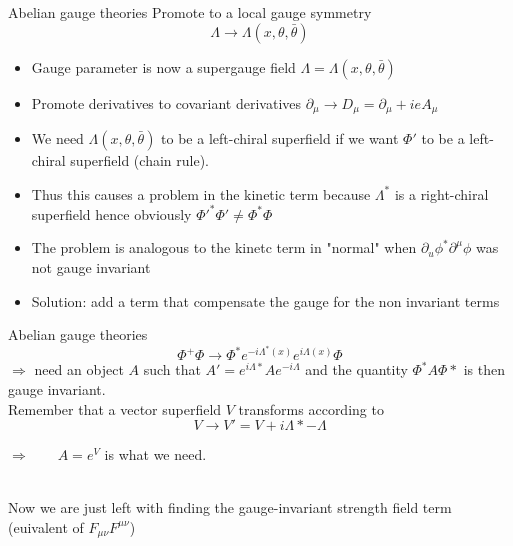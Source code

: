 \documentclass[10pt]{beamer}
\begin{document}
\begin{frame}{Abelian gauge theories}
Promote to a local gauge symmetry
\begin{equation*}
    \Lambda \to \Lambda(x, \theta, \bar\theta)
\end{equation*}
\begin{itemize}
    \item Gauge parameter is now a supergauge field $\Lambda = \Lambda(x, \theta, \bar\theta)$
    \item Promote derivatives to covariant derivatives $\partial_\mu \to D_\mu = \partial_\mu + ieA_{\mu}$
    \item We need $\Lambda(x, \theta, \bar\theta)$ to be a left-chiral superfield if we want $\Phi'$ to be a left-chiral superfield (chain rule). \\ 
    \item Thus this causes a problem in the kinetic term because $\Lambda^*$ is a right-chiral superfield
    hence obviously $\Phi'^*\Phi' \neq \Phi^*\Phi$
    \item The problem is analogous to the kinetc term in "normal" when $\partial_u \phi^* \partial^\mu \phi$ was not gauge invariant
    \item Solution: add a term that compensate the gauge for the non invariant terms
\end{itemize}
\end{frame}

\begin{frame}{Abelian gauge theories}
\begin{equation*}
    \Phi^+\Phi \rightarrow \Phi^* e^{-i\Lambda^*(x)} e^{i\Lambda(x)} \Phi
\end{equation*}
$\Rightarrow$ need an object $A$ such that $A' = e^{i\Lambda*} A e^{-i\Lambda}$ and the 
quantity $\Phi^*A\Phi*$ is then gauge invariant. \\
Remember that a vector superfield $V$ transforms according to 
\begin{equation*}
    V \rightarrow V' = V + i{\Lambda* - \Lambda}
\end{equation*}
\centerline{$\Rightarrow \qquad A = e^V$ is what we need.} \\
Now we are just left with finding the gauge-invariant strength field term (euivalent of $F_{\mu\nu}F^{\mu\nu}$)
\end{frame}
\end{document}
